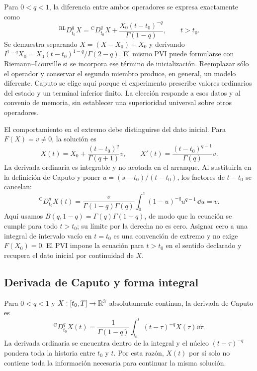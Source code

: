 Para $0<q<1$, la diferencia entre ambos operadores se expresa exactamente como
\begin{equation}
 {}^{\mathrm{RL}}D_{t_0}^qX
 ={}^{\mathrm C}D_{t_0}^qX+
 \frac{X_0(t-t_0)^{-q}}{\Gamma(1-q)},\qquad t>t_0.
 \label{eq:rl-caputo-initial-bridge}
\end{equation}
Se demuestra separando $X=(X-X_0)+X_0$ y derivando
$I^{1-q}X_0=X_0(t-t_0)^{1-q}/\Gamma(2-q)$.
El mismo PVI puede formularse con Riemann--Liouville si se incorpora ese
término de inicialización. Reemplazar sólo el operador y conservar el
segundo miembro produce, en general, un modelo diferente. Caputo se elige
aquí porque el experimento prescribe valores ordinarios del estado y un
terminal inferior finito. La elección responde a esos datos y al convenio
de memoria, sin establecer una superioridad universal sobre otros operadores.

El comportamiento en el extremo debe distinguirse del dato inicial.
Para $F(X)=v\ne0$, la solución es
\begin{equation}
 X(t)=X_0+\frac{(t-t_0)^q}{\Gamma(q+1)}v,
 \qquad X'(t)=\frac{(t-t_0)^{q-1}}{\Gamma(q)}v.
 \label{eq:caputo-initial-endpoint}
\end{equation}
La derivada ordinaria es integrable y no acotada en el arranque.
Al sustituirla en la definición de Caputo y poner
\(u=(s-t_0)/(t-t_0)\), los factores de \(t-t_0\) se cancelan:
\[
 {}^{\mathrm C}D_{t_0}^qX(t)=
 \frac{v}{\Gamma(1-q)\Gamma(q)}
 \int_0^1(1-u)^{-q}u^{q-1}\,\dd u=v.
\]
Aquí usamos \(B(q,1-q)=\Gamma(q)\Gamma(1-q)\), de modo que la
ecuación se cumple para todo \(t>t_0\);
su límite por la derecha no es cero. Asignar cero a una integral de
intervalo vacío en $t=t_0$ es una convención de extremo y no exige
$F(X_0)=0$. El PVI impone la ecuación para $t>t_0$ en el sentido declarado
y recupera el dato inicial por continuidad de $X$.

\subsection{Derivada de Caputo y forma integral}

Para \(0<q<1\) y \(X:[t_0,T]\to\mathbb{R}^3\) absolutamente continua, la derivada de
Caputo es
\begin{equation}
{}^{\mathrm C}D_{t_0}^{q}X(t)
=\frac{1}{\Gamma(1-q)}
\int_{t_0}^{t}(t-\tau)^{-q}\dot X(\tau)\dd\tau.
\label{eq:caputo}
\end{equation}
La derivada ordinaria se encuentra dentro de la integral y el núcleo
\((t-\tau)^{-q}\) pondera toda la historia entre \(t_0\) y \(t\). Por esta
razón, \(X(t)\) por sí solo no contiene toda la información necesaria para
continuar la misma solución.

